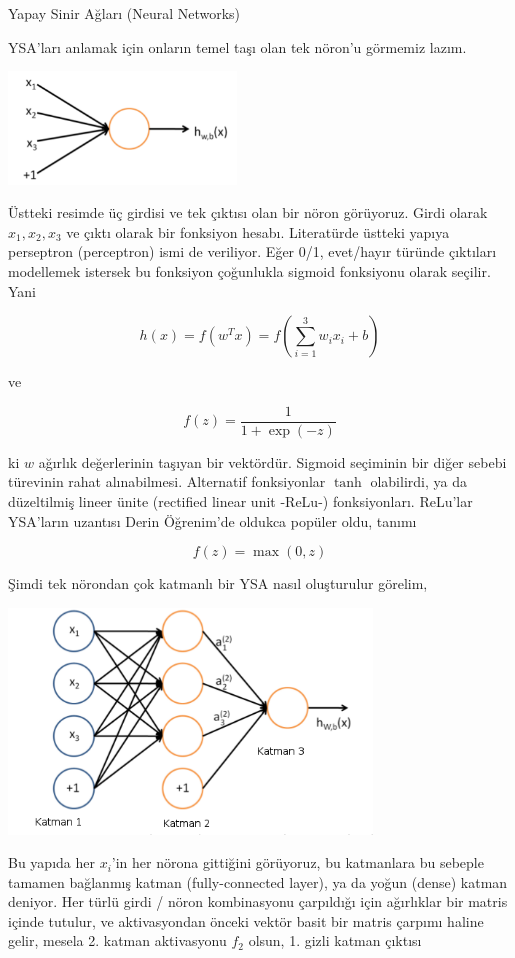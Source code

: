 \documentclass[12pt,fleqn]{article}\usepackage{../../common}
\begin{document}
Yapay Sinir Ağları (Neural Networks)

YSA'ları anlamak için onların temel taşı olan tek nöron'u görmemiz lazım. 

\includegraphics[height=3cm]{mlp_03.png}

Üstteki resimde üç girdisi ve tek çıktısı olan bir nöron görüyoruz. Girdi
olarak $x_1,x_2,x_3$ ve çıktı olarak bir fonksiyon hesabı. Literatürde
üstteki yapıya perseptron (perceptron) ismi de veriliyor. Eğer 0/1,
evet/hayır türünde çıktıları modellemek istersek bu fonksiyon çoğunlukla
sigmoid fonksiyonu olarak seçilir. Yani

$$ h (x) = f(w^Tx) = f(\sum _{i=1}^{3} w_ix_i + b)$$

ve 

$$ f(z) = \frac{1}{1 + \exp(-z)}$$

ki $w$ ağırlık değerlerinin taşıyan bir vektördür. Sigmoid seçiminin bir
diğer sebebi türevinin rahat alınabilmesi. Alternatif fonksiyonlar $\tanh$
olabilirdi, ya da düzeltilmiş lineer ünite (rectified linear unit -ReLu-)
fonksiyonları. ReLu'lar YSA'ların uzantısı Derin Öğrenim'de oldukca popüler
oldu, tanımı

$$ f(z) = \max(0,z)$$

Şimdi tek nörondan çok katmanlı bir YSA nasıl oluşturulur görelim, 

\includegraphics[height=6cm]{mlp_04.png}

Bu yapıda her $x_i$'in her nörona gittiğini görüyoruz, bu katmanlara bu
sebeple tamamen bağlanmış katman (fully-connected layer), ya da yoğun
(dense) katman deniyor. Her türlü girdi / nöron kombinasyonu çarpıldığı
için ağırlıklar bir matris içinde tutulur, ve aktivasyondan önceki vektör
basit bir matris çarpımı haline gelir, mesela 2. katman aktivasyonu $f_2$
olsun, 1. gizli katman çıktısı
\end{document}
